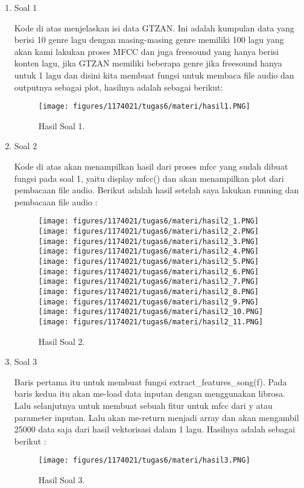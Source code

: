 \begin{enumerate}
	\item Soal 1
	\hfill\break
	
	Kode di atas menjelaskan isi data GTZAN. Ini adalah kumpulan data yang berisi 10 genre lagu dengan masing-masing genre memiliki 100 lagu yang akan kami lakukan proses MFCC dan juga freesound yang hanya berisi konten lagu, jika GTZAN memiliki beberapa genre jika freesound hanya untuk 1 lagu dan disini kita membuat fungsi untuk membaca file audio dan outputnya sebagai plot, hasilnya adalah sebagai berikut:
	\begin{figure}[H]
	\centering
		\texttt{[image: figures/1174021/tugas6/materi/hasil1.PNG]}
		\caption{Hasil Soal 1.}
	\end{figure}

	\item Soal 2
	\hfill\break
	
	Kode di atas akan menampilkan hasil dari proses mfcc yang sudah dibuat fungsi pada soal 1, yaitu display mfcc() dan akan menampilkan plot dari pembacaan file audio. Berikut adalah hasil setelah saya lakukan running dan pembacaan file audio :
	\begin{figure}[H]
	\centering
		\texttt{[image: figures/1174021/tugas6/materi/hasil2\_1.PNG]}
		\texttt{[image: figures/1174021/tugas6/materi/hasil2\_2.PNG]}
		\texttt{[image: figures/1174021/tugas6/materi/hasil2\_3.PNG]}
		\texttt{[image: figures/1174021/tugas6/materi/hasil2\_4.PNG]}
		\texttt{[image: figures/1174021/tugas6/materi/hasil2\_5.PNG]}
		\texttt{[image: figures/1174021/tugas6/materi/hasil2\_6.PNG]}
		\texttt{[image: figures/1174021/tugas6/materi/hasil2\_7.PNG]}
		\texttt{[image: figures/1174021/tugas6/materi/hasil2\_8.PNG]}
		\texttt{[image: figures/1174021/tugas6/materi/hasil2\_9.PNG]}
		\texttt{[image: figures/1174021/tugas6/materi/hasil2\_10.PNG]}
		\texttt{[image: figures/1174021/tugas6/materi/hasil2\_11.PNG]}
		\caption{Hasil Soal 2.}
	\end{figure}

	\item Soal 3
	\hfill\break
	
	Baris pertama itu untuk membuat fungsi extract\_features\_song(f). Pada baris kedua itu akan me-load data inputan dengan menggunakan librosa. Lalu selanjutnya untuk membuat sebuah fitur untuk mfcc dari y atau parameter inputan. Lalu akan me-return menjadi array dan akan mengambil 25000 data saja dari hasil vektorisasi dalam 1 lagu. Hasilnya adalah sebagai berikut :
	\begin{figure}[H]
	\centering
		\texttt{[image: figures/1174021/tugas6/materi/hasil3.PNG]}
		\caption{Hasil Soal 3.}
	\end{figure}


\end{enumerate}
